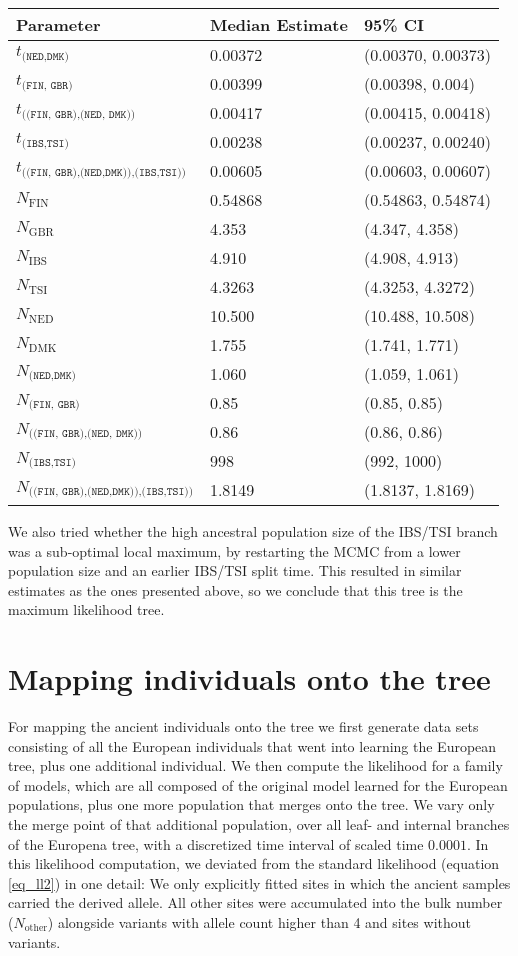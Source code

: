 \documentclass[a4paper]{article}
\begin{document}
\begin{tabular}{lll}
    \textbf{Parameter} & \textbf{Median Estimate} & \textbf{95\% CI}\\ \hline
    $t_\texttt{(NED,DMK)}$ & 0.00372 & (0.00370, 0.00373)\\
    $t_\texttt{(FIN, GBR)}$ & 0.00399 & (0.00398, 0.004)\\
    $t_\texttt{((FIN, GBR),(NED, DMK))}$ & 0.00417 & (0.00415, 0.00418)\\
    $t_\texttt{(IBS,TSI)}$ & 0.00238 & (0.00237, 0.00240)\\
    $t_\texttt{((FIN, GBR),(NED,DMK)),(IBS,TSI))}$ & 0.00605 & (0.00603, 0.00607)\\
    $N_\mathrm{FIN}$ & 0.54868 & (0.54863, 0.54874)\\
    $N_\mathrm{GBR}$ & 4.353 & (4.347, 4.358)\\
    $N_\mathrm{IBS}$ & 4.910 & (4.908, 4.913)\\
    $N_\mathrm{TSI}$ & 4.3263 & (4.3253, 4.3272)\\
    $N_\mathrm{NED}$ & 10.500 & (10.488, 10.508)\\
    $N_\mathrm{DMK}$ & 1.755 & (1.741, 1.771)\\
    $N_\texttt{(NED,DMK)}$ & 1.060 & (1.059, 1.061)\\
    $N_\texttt{(FIN, GBR)}$ & 0.85 & (0.85, 0.85)\\
    $N_\texttt{((FIN, GBR),(NED, DMK))}$ & 0.86 & (0.86, 0.86)\\
    $N_\texttt{(IBS,TSI)}$ & 998 & (992, 1000)\\
    $N_\texttt{((FIN, GBR),(NED,DMK)),(IBS,TSI))}$ & 1.8149 & (1.8137, 1.8169)\\
\end{tabular}

We also tried whether the high ancestral population size of the IBS/TSI branch was a sub-optimal local maximum, by restarting the MCMC from a lower population size and an earlier IBS/TSI split time. This resulted in similar estimates as the ones presented above, so we conclude that this tree is the maximum likelihood tree.

\section*{Mapping individuals onto the tree}
For mapping the ancient individuals onto the tree we first generate data sets consisting of all the European individuals that went into learning the European tree, plus one additional individual. We then compute the likelihood for a family of models, which are all composed of the original model learned for the European populations, plus one more population that merges onto the tree. We vary only the merge point of that additional population, over all leaf- and internal branches of the Europena tree, with a discretized time interval of scaled time $0.0001$. In this likelihood computation, we deviated from the standard likelihood (equation \ref{eq_ll2}) in one detail: We only explicitly fitted sites in which the ancient samples carried the derived allele. All other sites were accumulated into the bulk number ($N_\mathrm{other}$) alongside variants with allele count higher than 4 and sites without variants.
\end{document}
